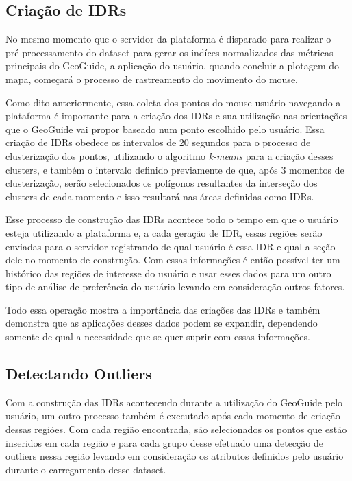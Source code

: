 \subsection{Criação de IDRs}

No mesmo momento que o servidor da plataforma é disparado para realizar o pré-processamento do dataset para gerar os indíces normalizados das métricas principais do GeoGuide, a aplicação do usuário, quando concluir a plotagem do mapa, começará o processo de rastreamento do movimento do mouse.

Como dito anteriormente, essa coleta dos pontos do mouse usuário navegando a plataforma é importante para a criação dos IDRs e sua utilização nas orientações que o GeoGuide vai propor baseado num ponto escolhido pelo usuário. Essa criação de IDRs obedece os intervalos de $20$ segundos para o processo de clusterização dos pontos, utilizando o algoritmo \textit{k-means} para a criação desses clusters, e também o intervalo definido previamente de que, após $3$ momentos de clusterização, serão selecionados os polígonos resultantes da interseção dos clusters de cada momento e isso resultará nas áreas definidas como IDRs.

Esse processo de construção das IDRs acontece todo o tempo em que o usuário esteja utilizando a plataforma e, a cada geração de IDR, essas regiões serão enviadas para o servidor registrando de qual usuário é essa IDR e qual a seção dele no momento de construção. Com essas informações é então possível ter um histórico das regiões de interesse do usuário e usar esses dados para um outro tipo de análise de preferência do usuário levando em consideração outros fatores.

Todo essa operação mostra a importância das criações das IDRs e também demonstra que as aplicações desses dados podem se expandir, dependendo somente de qual a necessidade que se quer suprir com essas informações.

\subsection{Detectando Outliers}

Com a construção das IDRs acontecendo durante a utilização do GeoGuide pelo usuário, um outro processo também é executado após cada momento de criação dessas regiões. Com cada região encontrada, são selecionados os pontos que estão inseridos em cada região e para cada grupo desse efetuado uma detecção de outliers nessa região levando em consideração os atributos definidos pelo usuário durante o carregamento desse dataset.

